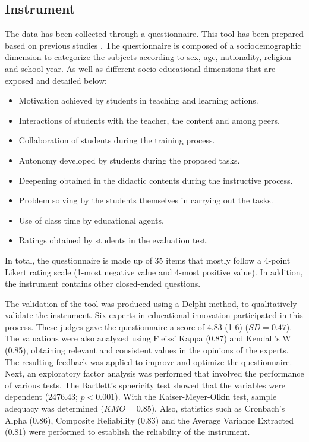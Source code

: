 \documentclass{textolivre}
\begin{document}
\subsection{Instrument}
The data has been collected through a questionnaire. This tool has been prepared based on previous studies \cite{pozosanchez-lopezbelmonte-morenoguerrero-hijonolucena2020}. %
The questionnaire is composed of a sociodemographic dimension to categorize the subjects according to sex, age, nationality, religion and school year. As well as different socio-educational dimensions that are exposed and detailed below:

\begin{itemize}
    \item Motivation achieved by students in teaching and learning actions.
    \item Interactions of students with the teacher, the content and among peers.
    \item Collaboration of students during the training process.
    \item Autonomy developed by students during the proposed tasks.
    \item Deepening obtained in the didactic contents during the instructive process.
    \item Problem solving by the students themselves in carrying out the tasks.
    \item Use of class time by educational agents.
    \item Ratings obtained by students in the evaluation test.
\end{itemize}

In total, the questionnaire is made up of 35 items that mostly follow a 4-point Likert rating scale (1-most negative value and 4-most positive value). In addition, the instrument contains other closed-ended questions.

The validation of the tool was produced using a Delphi method, to qualitatively validate the instrument. Six experts in educational innovation participated in this process. These judges gave the questionnaire a score of 4.83 (1-6) ($SD = 0.47$). The valuations were also analyzed using Fleiss' Kappa (0.87) and Kendall's W (0.85), obtaining relevant and consistent values in the opinions of the experts. The resulting feedback was applied to improve and optimize the questionnaire. Next, an exploratory factor analysis was performed that involved the performance of various tests. The Bartlett's sphericity test showed that the variables were dependent (2476.43; $p<0.001$). With the Kaiser-Meyer-Olkin test, sample adequacy was determined ($KMO = 0.85$). Also, statistics such as Cronbach's Alpha (0.86), Composite Reliability (0.83) and the Average Variance Extracted (0.81) were performed to establish the reliability of the instrument.
\end{document}
